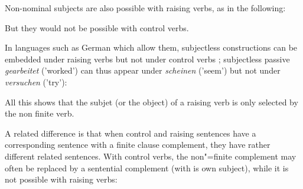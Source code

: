 \documentclass[output=paper
	        ,collection
	        ,collectionchapter
 	        ,biblatex
                ,babelshorthands
                ,newtxmath
                ,draftmode
                ,colorlinks, citecolor=brown
]{langscibook}
\begin{document}
Non-nominal subjects are also possible with raising verbs, as in the following:
 
\eal 
{}
 \label{under}
\zl

But they would not be possible with control verbs.
\eal
{}
\zl

In languages such as German which allow them, subjectless constructions can be embedded under
raising verbs but not under control verbs \citep[]{Mueller2002b}; subjectless passive \emph{gearbeitet} ('worked') can thus appear under \emph{scheinen} ('seem') but not under \emph{versuchen} ('try'):

\eal
\label{german1}
\zl
 
 All this shows that the subjet (or the object) of a raising verb is only selected by the non
 finite verb. 

A related difference is that when control and raising sentences have a corresponding sentence with a finite clause complement, they have rather different related sentences.
With control verbs, the non"=finite complement may often be replaced by a sentential complement (with is own subject), while it is not possible with raising verbs:

\eal
{}
\zl

\eal
{}
\zl
\end{document}
